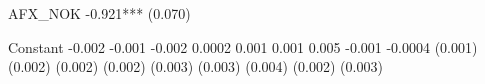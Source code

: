 AFX_NOK                                                                                                                                                                                                                      -0.921***       
                                                                                                                                                                                                                              (0.070)        
                                                                                                                                                                                                                                             
Constant                    -0.002                  -0.001                  -0.002                  0.0002                   0.001                    0.001                    0.005                  -0.001                  -0.0004        
                            (0.001)                 (0.002)                 (0.002)                 (0.002)                 (0.003)                  (0.003)                  (0.004)                 (0.002)                 (0.003)        
                                                                                                                                                                                                                                             

